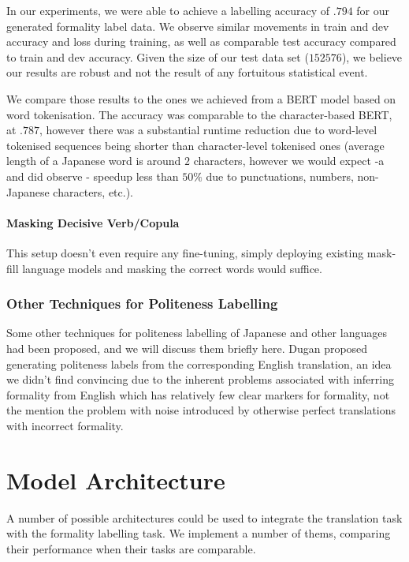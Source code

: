 \documentclass[11pt]{article}
\begin{document}
In our experiments, we were able to achieve a labelling accuracy of $.794$ for our generated formality label data. We observe similar movements in train and dev accuracy and loss during training, as well as comparable test accuracy compared to train and dev accuracy. Given the size of our test data set ($152576$), we believe our results are robust and not the result of any fortuitous statistical event.

We compare those results to the ones we achieved from a BERT model based on word tokenisation. The accuracy was comparable to the character-based BERT, at $.787$, however there was a substantial runtime reduction due to word-level tokenised sequences being shorter than character-level tokenised ones (average length of a Japanese word is around $2$ characters, however we would expect -a and did observe - speedup less than $50\%$ due to punctuations, numbers, non-Japanese characters, etc.). 

\paragraph{Masking Decisive Verb/Copula}

This setup doesn't even require any fine-tuning, simply deploying existing mask-fill language models and masking the correct words would suffice. 

\subsubsection{Other Techniques for Politeness Labelling}

Some other techniques for politeness labelling of Japanese and other languages had been proposed, and we will discuss them briefly here. Dugan \cite{Dugan:20} proposed generating politeness labels from the corresponding English translation, an idea we didn't find convincing due to the inherent problems associated with inferring formality from English which has relatively few clear markers for formality, not the mention the problem with noise introduced by otherwise perfect translations with incorrect formality.

\section{Model Architecture}

A number of possible architectures could be used to integrate the translation task with the formality labelling task. We implement a number of thems, comparing their performance when their tasks are comparable.
\end{document}
